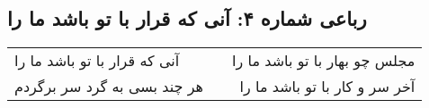 \begin{center}
\section*{رباعی شماره ۴: آنی که قرار با تو باشد ما را}
\label{sec:sh004}
\begin{longtable}{l p{0.5cm} r}
آنی که قرار با تو باشد ما را
&&
مجلس چو بهار با تو باشد ما را
\\
هر چند بسی به گرد سر برگردم
&&
آخر سر و کار با تو باشد ما را
\\
\end{longtable}
\end{center}
